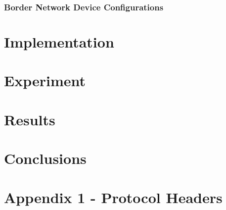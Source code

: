 \documentclass[12pt]{article}
\begin{document}
\subsubsection{Border Network Device Configurations}
\label{subsub:borderConfig}



\pagebreak

\section{Implementation}
\label{sec:4}

\pagebreak

\section{Experiment}
\label{sec:5}

\pagebreak

\section{Results}
\label{sec:6}

\pagebreak

\section{Conclusions}
\label{sec:7}

\pagebreak








\pagebreak


\appendix

\section{Appendix 1 - Protocol Headers}
\label{Appendix 1}
\end{document}
